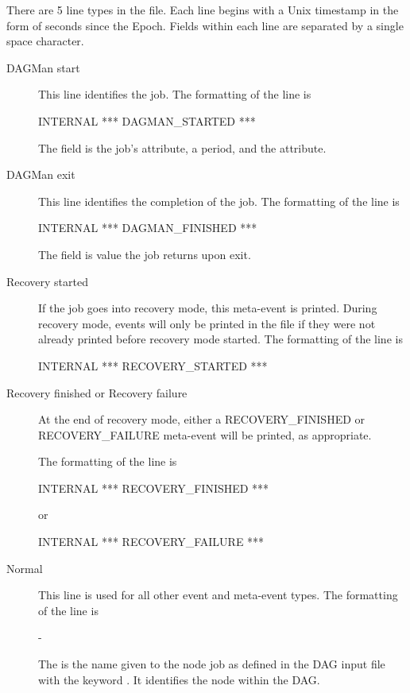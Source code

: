 There are 5 line types in the  file.
Each line begins with a Unix timestamp in the form of seconds since the Epoch.
Fields within each line are separated by a single space character.
\begin{description}

\item [DAGMan start] 
This line identifies the  job.
The formatting of the line is

 INTERNAL *** DAGMAN\_STARTED  ***

The  field is the  job's 
 attribute, a period, and the  attribute. 

\item [DAGMan exit] 
This line identifies the completion of the  job.
The formatting of the line is

 INTERNAL *** DAGMAN\_FINISHED  ***

The  field is value the  job returns upon exit. 

\item [Recovery started] 
If the  job goes into recovery mode,
this meta-event is printed.
During recovery mode, events will only be printed in the file
if they were not already printed before recovery mode started.
The formatting of the line is

 INTERNAL *** RECOVERY\_STARTED ***

\item [Recovery finished or Recovery failure] 
At the end of recovery
mode, either a RECOVERY\_FINISHED or RECOVERY\_FAILURE meta-event will be
printed, as appropriate.

The formatting of the line is

 INTERNAL *** RECOVERY\_FINISHED ***

or

 INTERNAL *** RECOVERY\_FAILURE ***

\item [Normal]
This line is used for all other event and meta-event types.
The formatting of the line is

     - 

The  is the name given to the node job as defined in
the DAG input file with the keyword .
It identifies the node within the DAG.


\end{description}
